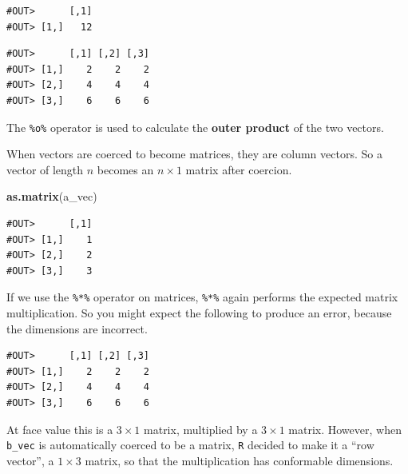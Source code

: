 \documentclass[]{book}
\newenvironment{Shaded}{\begin{snugshade}}{\end{snugshade}}
\newcommand{\KeywordTok}[1]{\textcolor[rgb]{0.13,0.29,0.53}{\textbf{#1}}}
\newcommand{\StringTok}[1]{\textcolor[rgb]{0.31,0.60,0.02}{#1}}
\newcommand{\CommentTok}[1]{\textcolor[rgb]{0.56,0.35,0.01}{\textit{#1}}}
\newcommand{\OperatorTok}[1]{\textcolor[rgb]{0.81,0.36,0.00}{\textbf{#1}}}
\newcommand{\NormalTok}[1]{#1}
\theoremstyle{definition}
\theoremstyle{definition}
\theoremstyle{definition}
\theoremstyle{remark}
\begin{document}
\begin{verbatim}
#OUT>      [,1]
#OUT> [1,]   12
\end{verbatim}

\begin{Shaded}
\end{Shaded}

\begin{verbatim}
#OUT>      [,1] [,2] [,3]
#OUT> [1,]    2    2    2
#OUT> [2,]    4    4    4
#OUT> [3,]    6    6    6
\end{verbatim}

The \texttt{\%o\%} operator is used to calculate the \textbf{outer
product} of the two vectors.

When vectors are coerced to become matrices, they are column vectors. So
a vector of length \(n\) becomes an \(n \times 1\) matrix after
coercion.

\begin{Shaded}
\begin{Highlighting}[]
\KeywordTok{as.matrix}\NormalTok{(a_vec)}
\end{Highlighting}
\end{Shaded}

\begin{verbatim}
#OUT>      [,1]
#OUT> [1,]    1
#OUT> [2,]    2
#OUT> [3,]    3
\end{verbatim}

If we use the \texttt{\%*\%} operator on matrices, \texttt{\%*\%} again
performs the expected matrix multiplication. So you might expect the
following to produce an error, because the dimensions are incorrect.

\begin{Shaded}
\end{Shaded}

\begin{verbatim}
#OUT>      [,1] [,2] [,3]
#OUT> [1,]    2    2    2
#OUT> [2,]    4    4    4
#OUT> [3,]    6    6    6
\end{verbatim}

At face value this is a \(3 \times 1\) matrix, multiplied by a
\(3 \times 1\) matrix. However, when \texttt{b\_vec} is automatically
coerced to be a matrix, \texttt{R} decided to make it a ``row vector'',
a \(1 \times 3\) matrix, so that the multiplication has conformable
dimensions.
\end{document}
